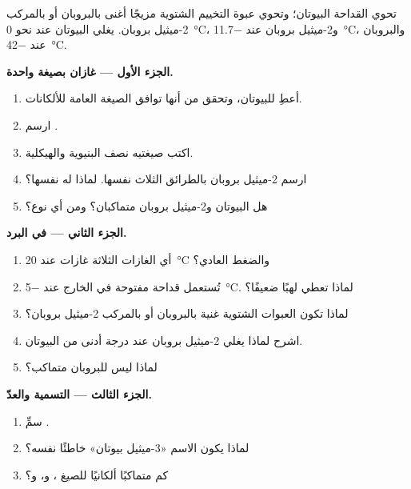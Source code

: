 \begin{problem}
\label{pb:g11:organic-skeletons:1}
تحوي القداحة البيوتان؛ وتحوي عبوة التخييم الشتوية مزيجًا أغنى
بالبروبان أو بالمركب 2-ميثيل بروبان. يغلي البيوتان عند نحو
\qty{0}{\celsius}، و2-ميثيل بروبان عند \qty{-11.7}{\celsius}، والبروبان
عند \qty{-42}{\celsius}.

\medskip
\noindent\textbf{الجزء الأول --- غازان بصيغة واحدة.}
\begin{enumerate}
  \item أعطِ  للبيوتان، وتحقق من أنها توافق
        الصيغة العامة للألكانات.
  \item ارسم .
  \item اكتب صيغتيه نصف البنيوية والهيكلية.
  \item ارسم 2-ميثيل بروبان بالطرائق الثلاث نفسها. لماذا له
         نفسها؟
  \item هل البيوتان و2-ميثيل بروبان متماكبان؟ ومن أي نوع؟
\end{enumerate}

\medskip
\noindent\textbf{الجزء الثاني --- في البرد.}
\begin{enumerate}[resume]
  \item أي الغازات الثلاثة غازات عند \qty{20}{\celsius} والضغط
        العادي؟
  \item تُستعمل قداحة مفتوحة في الخارج عند \qty{-5}{\celsius}. لماذا
        تعطي لهبًا ضعيفًا؟
  \item لماذا تكون العبوات الشتوية غنية بالبروبان أو بالمركب 2-ميثيل بروبان؟
  \item اشرح لماذا يغلي 2-ميثيل بروبان عند درجة أدنى من البيوتان.
  \item لماذا ليس للبروبان متماكب؟
\end{enumerate}

\medskip
\noindent\textbf{الجزء الثالث --- التسمية والعدّ.}
\begin{enumerate}[resume]
  \item سمِّ .
  \item لماذا يكون الاسم «3-ميثيل بيوتان» خاطئًا  نفسه؟
  \item كم متماكبًا ألكانيًا للصيغ ،
        و، و؟
\end{enumerate}


\end{problem}

